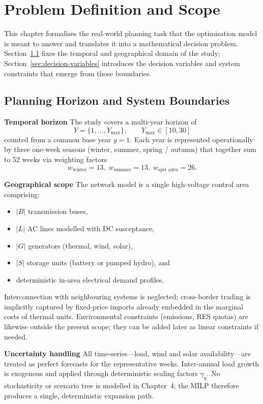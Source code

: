 \newpage
\section{Problem Definition and Scope}
\label{sec:problem-definition}

This chapter formalises the real-world planning task that the optimisation model is 
meant to answer and translates it into a mathematical decision problem. 
Section~\ref{sec:planning-horizon} fixes the temporal and geographical domain of 
the study; Section~\ref{sec:decision-variables} introduces the decision variables and 
system constraints that emerge from those boundaries.

\subsection{Planning Horizon and System Boundaries}
\label{sec:planning-horizon}

\textbf{Temporal horizon} \quad The study covers a multi-year horizon of
\[
Y=\{1,\dots,Y_{\max}\},\qquad Y_{\max}\in[10,30]
\]
counted from a common base year $y=1$. Each year is represented operationally by three one-week seasons (winter, summer, spring / autumn) that together sum to 52 weeks via weighting factors
\[
w_{\text{winter}}=13,\;w_{\text{summer}}=13,\;w_{\text{spri autu}}=26.
\]

\textbf{Geographical scope} \quad The network model is a single high-voltage control area comprising:
\begin{itemize}
    \item $|B|$ transmission buses,
    \item $|L|$ AC lines modelled with DC susceptance,
    \item $|G|$ generators (thermal, wind, solar),
    \item $|S|$ storage units (battery or pumped hydro), and
    \item deterministic in-area electrical demand profiles.
\end{itemize}

Interconnection with neighbouring systems is neglected; cross-border trading is implicitly captured by fixed-price imports already embedded in the marginal costs of thermal units. Environmental constraints (emissions, RES quotas) are likewise outside the present scope; they can be added later as linear constraints if needed.

\textbf{Uncertainty handling} \quad All time-series---load, wind and solar availability---are treated as perfect forecasts for the representative weeks. Inter-annual load growth is exogenous and applied through deterministic scaling factors $\gamma_y$. No stochasticity or scenario tree is modelled in Chapter~4; the MILP therefore produces a single, deterministic expansion path.


